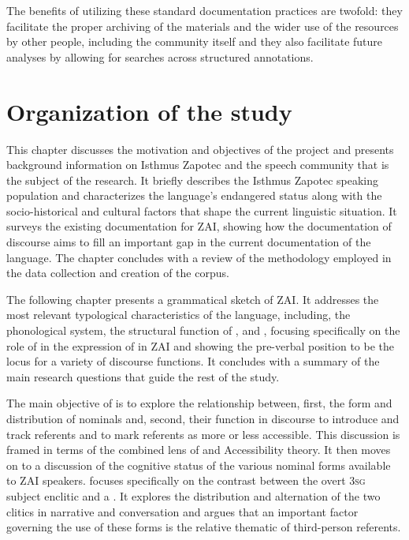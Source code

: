 The benefits of utilizing these standard documentation practices are twofold: they facilitate the proper archiving of the materials and the wider use of the resources by other people, including the community itself and they also facilitate future analyses by allowing for searches across structured annotations.



\section{Organization of the study}

This chapter discusses the motivation and objectives of the project and presents background information on Isthmus Zapotec and the speech community that is the subject of the research. It briefly describes the Isthmus Zapotec speaking population and characterizes the language's endangered status along with the socio-historical and cultural factors that shape the current linguistic situation. It surveys the existing documentation for ZAI, showing how the documentation of discourse aims to fill an important gap in the current documentation of the language. The chapter concludes with a review of the methodology employed in the data collection and creation of the corpus.

The following chapter presents a grammatical sketch of ZAI. It addresses the most relevant typological characteristics of the language, including, the phonological system, the structural function of , and , focusing specifically on the role of  in the expression of  in ZAI and showing the pre-verbal position to be the locus for a variety of discourse functions. It concludes with a summary of the main research questions that guide the rest of the study.

The main objective of  is to explore the relationship between, first, the form and distribution of nominals and, second, their function in discourse to introduce and track referents and to mark referents as more or less accessible.  This discussion is framed in terms of the combined lens of  and Accessibility theory. It then moves on to a discussion of the cognitive status of the various nominal forms available to ZAI speakers.  focuses specifically on the contrast between the overt \textsc{3sg} subject enclitic and a . It explores the distribution and alternation of the two  clitics in narrative and conversation and argues that an important factor governing the use of these forms is the relative thematic  of third-person referents.  

